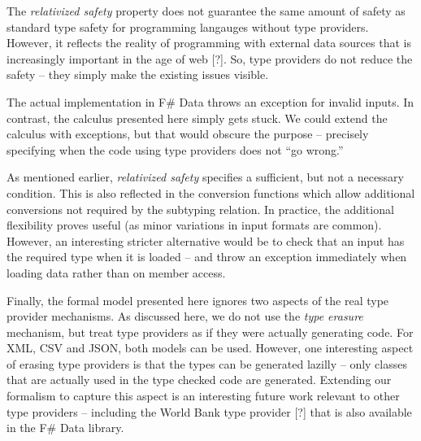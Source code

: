 \documentclass[preprint]{sigplanconf}
\begin{document}
The \emph{relativized safety} property does not guarantee the same amount of safety as standard type safety
for programming langauges without type providers. However, it reflects the reality of programming with external
data sources that is increasingly important in the age of web [?]. So, type providers do not reduce the safety
-- they simply make the existing issues visible.

The actual implementation in F\# Data throws an exception for invalid inputs. In contrast, the calculus
presented here simply gets stuck. We could extend the calculus with exceptions, but that would obscure the 
purpose -- precisely specifying when the code using type providers does not ``go wrong.''

As mentioned earlier, \emph{relativized safety} specifies a sufficient, but not a necessary condition.
This is also reflected in the conversion functions which allow additional conversions not required by 
the subtyping relation. In practice, the additional flexibility proves useful (as minor variations in 
input formats are common). However, an interesting stricter alternative would be to check that an input 
has the required type when it is loaded -- and throw an exception immediately when loading data rather than 
on member access.

Finally, the formal model presented here ignores two aspects of the real type provider mechanisms. As discussed
here, we do not use the \emph{type erasure} mechanism, but treat type providers as if they were actually 
generating code. For XML, CSV and JSON, both models can be used. However, one interesting aspect of erasing 
type providers is that the types can be generated lazilly -- only classes that are actually used in the type
checked code are generated. Extending our formalism to capture this aspect is an interesting future work
relevant to other type providers -- including the World Bank type provider [?] that is also available
in the F\# Data library.



%
%
\end{document}
